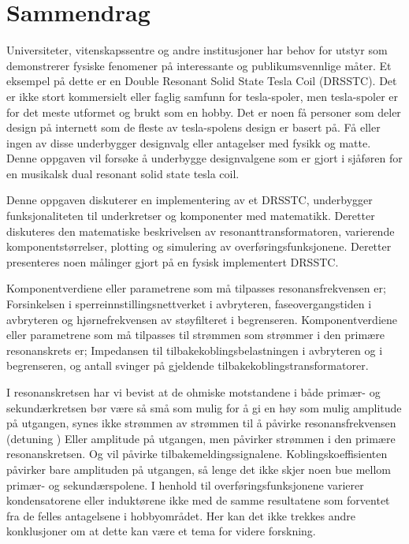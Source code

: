 \section*{Sammendrag}
Universiteter, vitenskapssentre og andre institusjoner har behov for utstyr som demonstrerer fysiske fenomener på interessante og publikumsvennlige måter. Et eksempel på dette er en Double Resonant Solid State Tesla Coil (DRSSTC). Det er ikke stort kommersielt eller faglig samfunn for tesla-spoler, men tesla-spoler er for det meste utformet og brukt som en hobby. Det er noen få personer som deler design på internett som de fleste av tesla-spolens design er basert på. Få eller ingen av disse underbygger designvalg eller antagelser med fysikk og matte. Denne oppgaven vil forsøke å underbygge designvalgene som er gjort i sjåføren for en musikalsk dual resonant solid state tesla coil.

Denne oppgaven diskuterer en implementering av et DRSSTC, underbygger funksjonaliteten til underkretser og komponenter med matematikk. Deretter diskuteres den matematiske beskrivelsen av resonanttransformatoren, varierende komponentstørrelser, plotting og simulering av overføringsfunksjonene. Deretter presenteres noen målinger gjort på en fysisk implementert DRSSTC.

Komponentverdiene eller parametrene som må tilpasses resonansfrekvensen er; Forsinkelsen i sperreinnstillingsnettverket i avbryteren, faseovergangstiden i avbryteren og hjørnefrekvensen av støyfilteret i begrenseren. Komponentverdiene eller parametrene som må tilpasses til strømmen som strømmer i den primære resonanskrets er; Impedansen til tilbakekoblingsbelastningen i avbryteren og i begrenseren, og antall svinger på gjeldende tilbakekoblingstransformatorer.

I resonanskretsen har vi bevist at de ohmiske motstandene i både primær- og sekundærkretsen bør være så små som mulig for å gi en høy som mulig amplitude på utgangen, synes ikke strømmen av strømmen til å påvirke resonansfrekvensen (detuning ) Eller amplitude på utgangen, men påvirker strømmen i den primære resonanskretsen. Og vil påvirke tilbakemeldingssignalene. Koblingskoeffisienten påvirker bare amplituden på utgangen, så lenge det ikke skjer noen bue mellom primær- og sekundærspolene. I henhold til overføringsfunksjonene varierer kondensatorene eller induktørene ikke med de samme resultatene som forventet fra de felles antagelsene i hobbyområdet. Her kan det ikke trekkes andre konklusjoner om at dette kan være et tema for videre forskning.